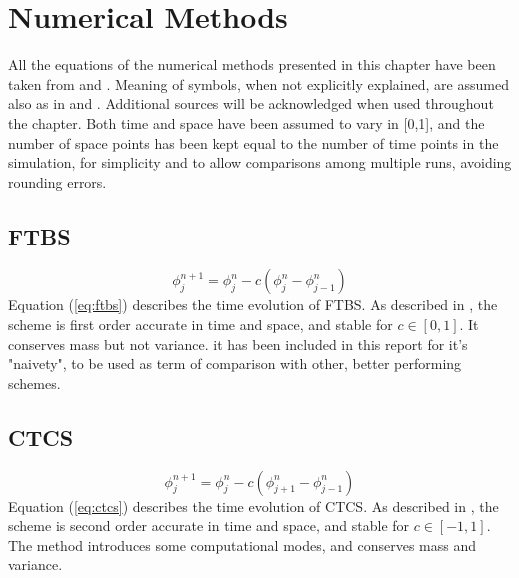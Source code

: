 
\section{Numerical Methods}
All the equations of the numerical methods presented in this chapter have been taken from \cite{mpebook} and \cite{nmnotes}. Meaning of symbols, when not explicitly explained, are assumed also as in \cite{mpebook} and \cite{nmnotes}. Additional sources will be acknowledged when used throughout the chapter.
Both time and space have been assumed to vary in [0,1], and the number of space points has been kept equal to the number of time points in the simulation, for simplicity and to allow comparisons among multiple runs, avoiding rounding errors.

\subsection{FTBS}

\begin{equation}
\phi_j^{n+1}=\phi_j^{n}-c(\phi_j^{n}-\phi_{j-1}^{n})
\label{eq:ftbs}
\end{equation}
Equation (\ref{eq:ftbs}) describes the time evolution of FTBS. As described in \cite{mpebook}, the scheme is first order accurate in time and space, and stable for $c\in[0,1]$. It conserves mass but not variance. it has been included in this report for it's "naivety", to be used as term of comparison with other, better performing schemes.


\subsection{CTCS}
\begin{equation}
\phi_j^{n+1}=\phi_j^{n}-c(\phi_{j+1}^{n}-\phi_{j-1}^{n})
\label{eq:ctcs}
\end{equation}
Equation (\ref{eq:ctcs}) describes the time evolution of CTCS. As described in \cite{mpebook}, the scheme is second order accurate in time and space, and stable for $c\in[-1,1]$. The method introduces some computational modes, and conserves mass and variance.


